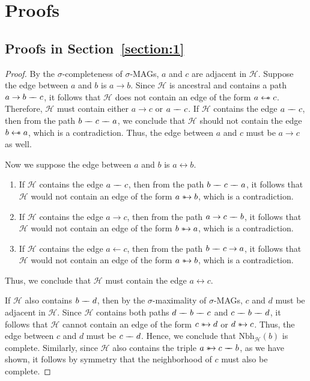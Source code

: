 \documentclass[accepted]{uai2025} %
\newcommand{\tuh}{\mathrel{\rightarrow}}
\newcommand{\hut}{\mathrel{\leftarrow}}
\newcommand{\huh}{\mathrel{\leftrightarrow}}
\newcommand{\hus}{\mathrel{{\leftarrow\mkern-11mu\ast}}}
\newcommand{\suh}{\mathrel{{\ast\mkern-11mu\to}}}
\newcommand{\tut}{\mathrel{{\relbar\mkern-9mu\relbar}}}
\begin{document}
\section{Proofs}
\subsection{Proofs in Section~\ref{section:1}}
\lemmadef*
\begin{proof}
By the \( \sigma \)-completeness of \( \sigma \)-MAGs, \( a \) and \( c \) are adjacent in \( \mathcal{H} \). Suppose the edge between \( a \) and \( b \) is \( a \tuh b \). Since \( \mathcal{H} \) is ancestral and contains a path \( a \tuh b \tut c \), it follows that \( \mathcal{H} \) does not contain an edge of the form \( a \hus c \). Therefore, \( \mathcal{H} \) must contain either \( a \tuh c \) or \( a \tut c \). If \( \mathcal{H} \) contains the edge \( a \tut c \), then from the path \( b \tut c \tut a \), we conclude that \( \mathcal{H} \) should not contain the edge \( b \hus a \), which is a contradiction. Thus, the edge between \( a \) and \( c \) must be \( a \tuh c \) as well.

Now we suppose the edge between \( a \) and \( b \) is \( a \huh b \). 
\begin{enumerate}
\item If \( \mathcal{H} \) contains the edge \( a \tut c \), then from the path \( b \tut c \tut a \), it follows that \( \mathcal{H} \) would not contain an edge of the form \( a \suh b \), which is a contradiction.
\item If \( \mathcal{H} \) contains the edge \( a \tuh c \), then from the path \( a \tuh c \tut b \), it follows that \( \mathcal{H} \) would not contain an edge of the form \( b \suh a \), which is a contradiction.
\item If \( \mathcal{H} \) contains the edge \( a \hut c \), then from the path \( b \tut c \tuh a \), it follows that \( \mathcal{H} \) would not contain an edge of the form \( a \suh b \), which is a contradiction.
\end{enumerate}
Thus, we conclude that \( \mathcal{H} \) must contain the edge \( a \huh c \).


If \( \mathcal{H} \) also contains \( b \tut d \), then by the \( \sigma \)-maximality of \( \sigma \)-MAGs, \( c \) and \( d \) must be adjacent in \( \mathcal{H} \). Since \( \mathcal{H} \) contains both paths \( d \tut b \tut c \) and \( c \tut b \tut d \), it follows that \( \mathcal{H} \) cannot contain an edge of the form \( c \suh d \) or \( d \suh c \). Thus, the edge between \( c \) and \( d \) must be \( c \tut d \). Hence, we conclude that $\text{Nbh}_\mathcal{H}(b)$ is complete. Similarly, since \( \mathcal{H} \) also contains the triple \( a \suh c \tut b \), as we have shown, it follows by symmetry that the neighborhood of \( c \) must also be complete.
\end{proof}
\end{document}
